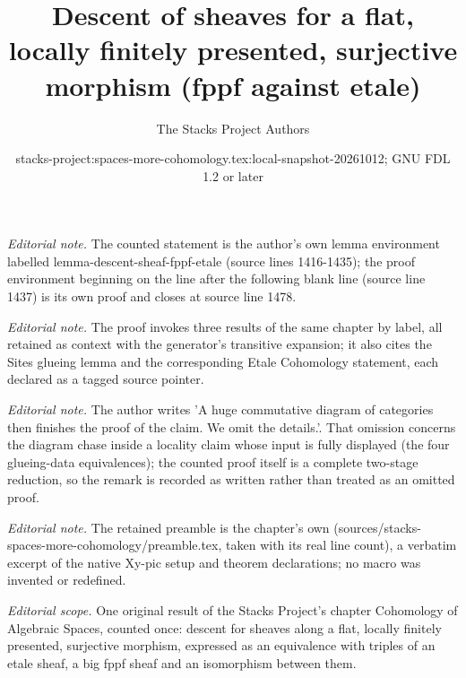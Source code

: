 \documentclass{stacks-project}
\title{Descent of sheaves for a flat, locally finitely presented, surjective morphism (fppf against etale)}
\author{The Stacks Project Authors}
\date{stacks-project:spaces-more-cohomology.tex:local-snapshot-20261012; GNU FDL 1.2 or later}
\theoremstyle{plain}
\theoremstyle{definition}
\theoremstyle{remark}
\numberwithin{equation}{subsection}
\begin{document}
\maketitle
\noindent\textit{Editorial note.} The counted statement is the author's own lemma environment labelled lemma-descent-sheaf-fppf-etale (source lines 1416-1435); the proof environment beginning on the line after the following blank line (source line 1437) is its own proof and closes at source line 1478.\par\medskip
\noindent\textit{Editorial note.} The proof invokes three results of the same chapter by label, all retained as context with the generator's transitive expansion; it also cites the Sites glueing lemma and the corresponding Etale Cohomology statement, each declared as a tagged source pointer.\par\medskip
\noindent\textit{Editorial note.} The author writes 'A huge commutative diagram of categories then finishes the proof of the claim. We omit the details.'. That omission concerns the diagram chase inside a locality claim whose input is fully displayed (the four glueing-data equivalences); the counted proof itself is a complete two-stage reduction, so the remark is recorded as written rather than treated as an omitted proof.\par\medskip
\noindent\textit{Editorial note.} The retained preamble is the chapter's own (sources/stacks-spaces-more-cohomology/preamble.tex, taken with its real line count), a verbatim excerpt of the native Xy-pic setup and theorem declarations; no macro was invented or redefined.\par\medskip
\noindent\textit{Editorial scope.} One original result of the Stacks Project's chapter Cohomology of Algebraic Spaces, counted once: descent for sheaves along a flat, locally finitely presented, surjective morphism, expressed as an equivalence with triples of an etale sheaf, a big fppf sheaf and an isomorphism between them.\par\medskip
\end{document}
